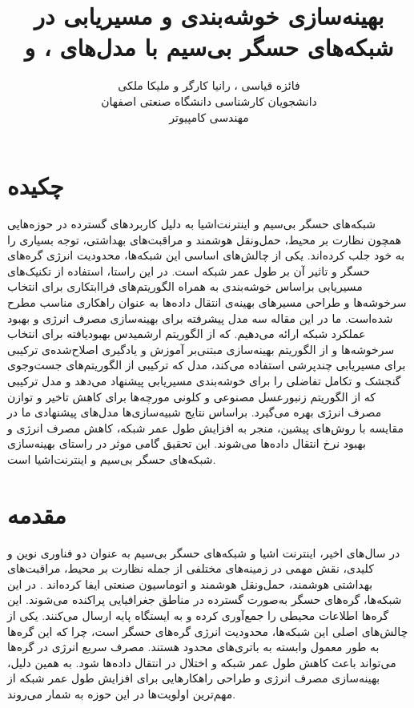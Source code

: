 \documentclass[11.5pt,onecolumn,a4paper]{article}
\begin{document}
	
	
	\title{بهینه‌سازی خوشه‌بندی و مسیر‌یابی در شبکه‌های حسگر بی‌سیم با مدل‌های ،  و } 
	\author{فائزه قیاسی ، رانیا کارگر و ملیکا ملکی\\
		دانشجویان کارشناسی دانشگاه صنعتی اصفهان\\
		مهندسی کامپیوتر}
	\date{}
	\maketitle
	
	\section*{چکیده}
	شبکه‌های حسگر بی‌سیم و اینترنت‌اشیا به دلیل کاربردهای گسترده در حوزه‌هایی همچون نظارت بر محیط، حمل‌ونقل هوشمند و مراقبت‌های بهداشتی، توجه بسیاری را به خود جلب کرده‌اند. یکی از چالش‌های اساسی این شبکه‌ها، محدودیت انرژی گره‌های حسگر و تاثیر آن بر طول عمر شبکه است. در این راستا، استفاده از تکنیک‌های مسیریابی براساس خوشه‌بندی به‌ همراه الگوریتم‌های فراابتکاری برای انتخاب سرخوشه‌ها و طراحی مسیرهای بهینه‌ی انتقال داده‌ها به عنوان راهکاری مناسب مطرح شده‌است. ما در این مقاله سه مدل پیشرفته برای بهینه‌سازی مصرف انرژی و بهبود عملکرد شبکه ارائه می‌دهیم.  که از الگوریتم ارشمیدس بهبودیافته برای انتخاب سرخوشه‌ها و از الگوریتم بهینه‌سازی مبتنی‌بر آموزش و یادگیری اصلاح‌شده‌ی ترکیبی برای مسیریابی چندپرشی استفاده می‌کند، مدل  که ترکیبی از الگوریتم‌های جست‌وجوی گنجشک و تکامل تفاضلی را برای خوشه‌بندی مسیریابی پیشنهاد می‌دهد و مدل ترکیبی  که از الگوریتم زنبورعسل مصنوعی و کلونی مورچه‌ها برای کاهش تاخیر و توازن مصرف انرژی بهره می‌گیرد. براساس نتایج شبیه‌سازی‌ها مدل‌های پیشنهادی ما در مقایسه با روش‌های پیشین، منجر به افزایش طول عمر شبکه، کاهش مصرف انرژی و بهبود نرخ انتقال داده‌ها می‌شوند. این تحقیق گامی موثر در راستای بهینه‌سازی شبکه‌های حسگر بی‌سیم و اینترنت‌اشیا است.
	\newpage
	\section*{مقدمه}
	\hspace*{1em}در سال‌های اخیر، اینترنت اشیا و شبکه‌های حسگر بی‌سیم به عنوان دو فناوری نوین و کلیدی، نقش مهمی در زمینه‌های مختلفی از جمله نظارت بر محیط، مراقبت‌های بهداشتی هوشمند، حمل‌ونقل هوشمند و اتوماسیون صنعتی ایفا کرده‌اند \cite{ref1, ref2, ref3}. در این شبکه‌ها، گره‌های حسگر به‌صورت گسترده در مناطق جغرافیایی پراکنده می‌شوند. این گره‌ها اطلاعات محیطی را جمع‌آوری کرده و به ایستگاه‌ پایه ارسال می‌کنند. یکی از چالش‌های اصلی این شبکه‌ها، محدودیت انرژی گره‌های حسگر است، چرا که این گره‌ها به طور معمول وابسته به باتری‌های محدود هستند. مصرف سریع انرژی در گره‌ها می‌تواند باعث کاهش طول عمر شبکه و اختلال در انتقال داده‌ها شود. به همین دلیل، بهینه‌سازی مصرف انرژی و طراحی راهکارهایی برای افزایش طول عمر شبکه از مهم‌ترین اولویت‌ها در این حوزه به‌ شمار می‌روند.
	
\end{document}
